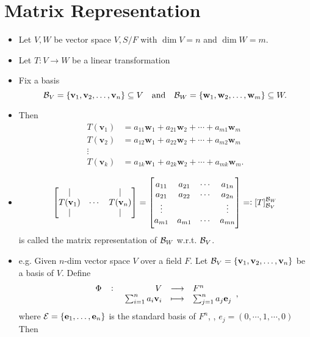 \documentclass[11pt,openany]{article}
\renewcommand{\vec}[1]{\mathbf{#1}}
\begin{document}
\newpage
{}		

\iffalse
\section*{Matrix Representation}
\begin{itemize}
	\item Let $V,W$ be vector space $V,S/F$ with $\dim V=n$ and $\dim W=m$.
	\item Let $T:V\to W$ be a linear transformation
	\item Fix a basis \[
	\basis_V=\set{\vec{v}_1,\vec{v}_2,\dots,\vec{v}_n}\subseteq V\quad\text{and}\quad\basis_W=\set{\vec{w}_1,\vec{w}_2,\dots,\vec{w}_m}\subseteq W.
	\]
	\item Then \begin{align*}
		T(\vec{v}_1)&=a_{11}\vec{w}_1+a_{21}\vec{w}_2+\cdots+a_{m1}\vec{w}_m\\
		T(\vec{v}_2)&=a_{12}\vec{w}_1+a_{22}\vec{w}_2+\cdots+a_{m2}\vec{w}_m\\
		\vdots &\\
		T(\vec{v}_k)&=a_{1k}\vec{w}_1+a_{2k}\vec{w}_2+\cdots+a_{mk}\vec{w}_m.
	\end{align*}
	\item \[
	\begin{bmatrix}
		\mid & & \mid \\
		T(\vec{v}_1)& \cdots & T(\vec{v}_n)\\
		\mid & & \mid
	\end{bmatrix}=\begin{bmatrix}
	a_{11} & a_{21} & \cdots & a_{1n}\\
	a_{21} & a_{22} & \cdots & a_{2n}\\
	\vdots & & &\vdots  \\
	a_{m1} & a_{m1} & \cdots & a_{mn}\\
\end{bmatrix}=:[T]_{\basis_V}^{\basis_W}
	\] is called the matrix representation of $\mathcal{B}_W$ w.r.t. $\mathcal{B}_V$.
	\item e.g. Given $n$-dim vector space $V$ over a field $F$. Let $\basis_V=\set{\vec{v}_1,\vec{v}_2,\dots,\vec{v}_n}$ be a basis of $V$. Define \[
	\fullfunction{\Phi}{V}{F^n}{\sum_{i=1}^{n}a_i\vec{v}_i}{\sum_{j=1}^{n}a_j\vec{e}_j},
	\] where $\mathcal{E}=\set{\vec{e}_1,\dots,\vec{e}_n}$ is the standard basis of $F^n$, \ie, $e_j=(0,\cdots,1,\cdots,0)$ Then \begin{align*}

\end{align*}
\end{itemize}
\end{document}
